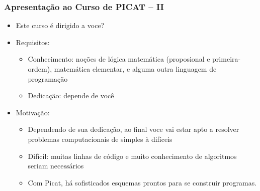 \begin{frame}[fragile]
  \frametitle{Apresentação ao Curso de PICAT -- II}
  \begin{itemize}

    \item Este curso é dirigido a voce?
  \pause
    \item Requisitos:
   \pause
		\begin{itemize}
			\item Conhecimento: noções de lógica matemática 
			(proposional e primeira-ordem), matemática elementar, 
			e alguma outra linguagem de programação

			\item Dedicação: depende de você
		\end{itemize}
		
  \pause
    \item Motivação:
   \pause
		\begin{itemize}
			\item Dependendo de sua dedicação, ao final voce vai estar apto a resolver problemas
			computacionais de simples à difíceis

			\item Difícil: muitas linhas de código e muito conhecimento de algoritmos seriam
			necessários
			
			\item Com Picat, há sofisticados esquemas prontos para se construir programas.

		\end{itemize}

  \end{itemize}

\end{frame}


